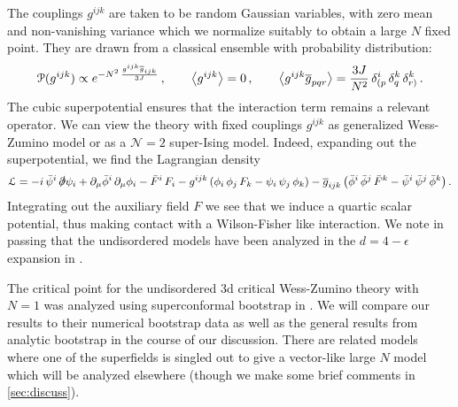 \documentclass[11pt]{article}
\newcommand{\psib}{\bar{\psi}}
\newcommand{\phib}{\bar{\phi}}
\newcommand{\Fb}{\bar{F}}
\begin{document}
The couplings $g^{ijk}$ are taken to be random Gaussian variables, with zero mean and non-vanishing variance  which we normalize suitably to obtain a large $N$ fixed point. They are drawn from a classical ensemble with probability distribution:
%
\begin{equation}\label{eq:gdist}
\mathcal{P}(g^{ijk}) \propto e^{-N^2\, \frac{g^{ijk} \overline{g}_{ijk}}{3J}} \,, \qquad \expval{ g^{ijk} } = 0 \,, \qquad 
\expval{ g^{ijk} \overline{g}_{pqr}  
} =  \frac{3J}{N^2}\, \delta^i_{(p}\, \delta^k_q\, \delta^k_{r)} \,.
\end{equation}	
%
The cubic superpotential ensures that the interaction term remains a relevant operator. We can view the theory with  fixed couplings $g^{ijk}$ as generalized Wess-Zumino model or  as a  $\mathcal{N}=2$ super-Ising model.  Indeed, expanding out the superpotential, we find the Lagrangian density 
%
\begin{equation}\label{eq:syk3d}
\mathcal{L} = -i\, \psib^i\, \slashed{\partial} \psi_i + \partial_\mu \phib^i\, \partial_\mu \phi_i -  \Fb^i \, F_i - g^{ijk} \left(\phi_i \, \phi_j \, F_k - \psi_i\, \psi_j\, \phi_k\right) -  \overline{g}_{ijk} \left(\phib^i \, \phib^j \, \Fb^k - \psib^i\, \psib^j\, \phib^k\right) .
\end{equation}	
%
Integrating out the auxiliary field $F$ we see that we induce a quartic scalar potential, thus making contact with a Wilson-Fisher like interaction. We note in passing that the undisordered models have been analyzed in the $d=4-\epsilon$ expansion in  \cite{Avdeev:1982jx,Jack:1998iy}.

The  critical point for the undisordered 3d critical Wess-Zumino theory with $N=1$ was analyzed using superconformal bootstrap in \cite{Bobev:2015vsa,Bobev:2015jxa}. We will compare our results to their numerical bootstrap data as well as the general results from analytic bootstrap \cite{Fitzpatrick:2012yx,Komargodski:2012ek,Costa:2012cb} in the course of our discussion. There are related models where one of the superfields is singled out to give a vector-like large $N$ model which will be analyzed elsewhere \cite{Chang:2021vm} (though we make some brief comments in \cref{sec:discuss}).
\end{document}
